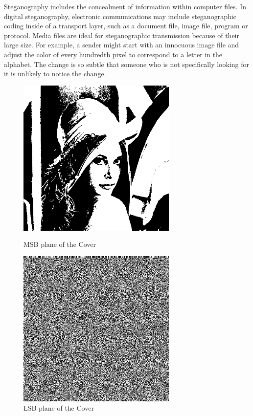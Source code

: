 \documentclass{report}
\newenvironment{ppl}{\fontfamily{pcr}\selectfont}{\par}
\begin{document}
\begin{center}
\begin{ppl}
Steganography includes the concealment of information within computer files. In digital steganography, electronic communications may include steganographic coding inside of a transport layer, such as a document file, image file, program or protocol. Media files are ideal for steganographic transmission because of their large size. For example, a sender might start with an innocuous image file and adjust the color of every hundredth pixel to correspond to a letter in the alphabet. The change is so subtle that someone who is not specifically looking for it is unlikely to notice the change.
\end{ppl}
\end{center}
\begin{figure}[H]
\centering
\begin{minipage}{0.46\linewidth}
\centering
\includegraphics[width=0.7\textwidth]{images/covermsb.png}
\caption{MSB plane of the Cover}
\end{minipage}
\hfill
\begin{minipage}{0.46\linewidth}
\centering
\includegraphics[width=0.7\textwidth]{images/coverlsb.png}
\caption{LSB plane of the Cover}
\end{minipage}
\end{figure}
\end{document}
